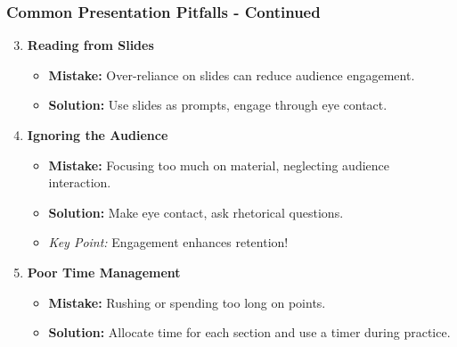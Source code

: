 \documentclass[aspectratio=169]{beamer}
\begin{document}
\begin{frame}[fragile]
    \frametitle{Common Presentation Pitfalls - Continued}
    \begin{enumerate}
        \setcounter{enumi}{2}
        \item \textbf{Reading from Slides}
        \begin{itemize}
            \item \textbf{Mistake:} Over-reliance on slides can reduce audience engagement.
            \item \textbf{Solution:} Use slides as prompts, engage through eye contact.
        \end{itemize}

        \item \textbf{Ignoring the Audience}
        \begin{itemize}
            \item \textbf{Mistake:} Focusing too much on material, neglecting audience interaction.
            \item \textbf{Solution:} Make eye contact, ask rhetorical questions.
            \item \textit{Key Point:} Engagement enhances retention!
        \end{itemize}

        \item \textbf{Poor Time Management}
        \begin{itemize}
            \item \textbf{Mistake:} Rushing or spending too long on points.
            \item \textbf{Solution:} Allocate time for each section and use a timer during practice.
        \end{itemize}
    \end{enumerate}
\end{frame}
\end{document}
